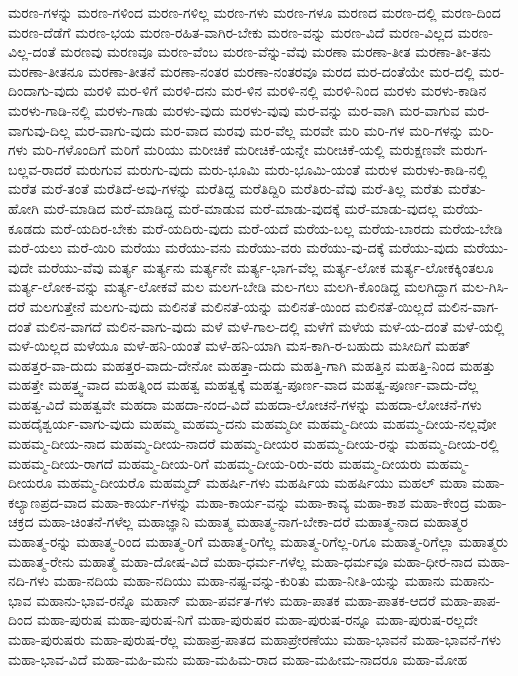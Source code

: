 {ಮರಣ-ಗಳನ್ನು
ಮರಣ-ಗಳಿಂದ
ಮರಣ-ಗಳಿಲ್ಲ
ಮರಣ-ಗಳು
ಮರಣ-ಗಳೂ
ಮರಣದ
ಮರಣ-ದಲ್ಲಿ
ಮರಣ-ದಿಂದ
ಮರಣ-ದೆಡೆಗೆ
ಮರಣ-ಭಯ
ಮರಣ-ರಹಿತ-ವಾಗಿರ-ಬೇಕು
ಮರಣ-ವನ್ನು
ಮರಣ-ವಿದೆ
ಮರಣ-ವಿಲ್ಲದ
ಮರಣ-ವಿಲ್ಲ-ದಂತೆ
ಮರಣವು
ಮರಣವೂ
ಮರಣ-ವೆಂಬ
ಮರಣ-ವೆನ್ನು-ವೆವು
ಮರಣಾ
ಮರಣಾ-ತೀತ
ಮರಣಾ-ತೀ-ತನು
ಮರಣಾ-ತೀತನೂ
ಮರಣಾ-ತೀತನೆ
ಮರಣಾ-ನಂತರ
ಮರಣಾ-ನಂತರವೂ
ಮರದ
ಮರ-ದಂತೆಯೇ
ಮರ-ದಲ್ಲಿ
ಮರ-ದಿಂದಾಗು-ವುದು
ಮರಳಿ
ಮರ-ಳಿಗೆ
ಮರಳಿ-ದನು
ಮರ-ಳಿನ
ಮರಳಿ-ನಲ್ಲಿ
ಮರಳಿ-ನಿಂದ
ಮರಳು
ಮರಳು-ಕಾಡಿನ
ಮರಳು-ಗಾಡಿ-ನಲ್ಲಿ
ಮರಳು-ಗಾಡು
ಮರಳು-ವುದು
ಮರಳು-ವುವು
ಮರ-ವನ್ನು
ಮರ-ವಾಗಿ
ಮರ-ವಾಗುವ
ಮರ-ವಾಗುವು-ದಿಲ್ಲ
ಮರ-ವಾಗು-ವುದು
ಮರ-ವಾದ
ಮರವು
ಮರ-ವೆಲ್ಲ
ಮರವೇ
ಮರಿ
ಮರಿ-ಗಳ
ಮರಿ-ಗಳನ್ನು
ಮರಿ-ಗಳು
ಮರಿ-ಗಳೊಂದಿಗೆ
ಮರಿಗೆ
ಮರಿಯು
ಮರೀಚಿಕೆ
ಮರೀಚಿಕೆ-ಯನ್ನೇ
ಮರೀಚಿಕೆ-ಯಲ್ಲಿ
ಮರುಕ್ಷಣವೇ
ಮರುಗ-ಬಲ್ಲವ-ರಾದರೆ
ಮರುಗುವ
ಮರುಗು-ವುದು
ಮರು-ಭೂಮಿ
ಮರು-ಭೂಮಿ-ಯಂತೆ
ಮರುಳ
ಮರುಳು-ಕಾಡಿ-ನಲ್ಲಿ
ಮರೆತ
ಮರೆ-ತಂತೆ
ಮರೆತಿದೆ-ಅವು-ಗಳನ್ನು
ಮರೆತಿದ್ದ
ಮರೆತಿದ್ದಿರಿ
ಮರೆತಿರು-ವೆವು
ಮರೆ-ತಿಲ್ಲ
ಮರೆತು
ಮರೆತು-ಹೋಗಿ
ಮರೆ-ಮಾಡಿದ
ಮರೆ-ಮಾಡಿದ್ದ
ಮರೆ-ಮಾಡುವ
ಮರೆ-ಮಾಡು-ವುದಕ್ಕೆ
ಮರೆ-ಮಾಡು-ವುದಲ್ಲ
ಮರೆಯ-ಕೂಡದು
ಮರೆ-ಯದಿರ-ಬೇಕು
ಮರೆ-ಯದಿರು-ವುದು
ಮರೆ-ಯದೆ
ಮರೆಯ-ಬಲ್ಲ
ಮರೆಯ-ಬಾರದು
ಮರೆಯ-ಬೇಡಿ
ಮರೆ-ಯಲು
ಮರೆ-ಯಿರಿ
ಮರೆಯು
ಮರೆಯು-ವನು
ಮರೆಯು-ವರು
ಮರೆಯು-ವು-ದಕ್ಕೆ
ಮರೆಯು-ವುದು
ಮರೆಯು-ವುದೇ
ಮರೆಯು-ವೆವು
ಮರ್ತ್ಯ
ಮರ್ತ್ಯನು
ಮರ್ತ್ಯನೇ
ಮರ್ತ್ಯ-ಭಾಗ-ವೆಲ್ಲ
ಮರ್ತ್ಯ-ಲೋಕ
ಮರ್ತ್ಯ-ಲೋಕಕ್ಕಿಂತಲೂ
ಮರ್ತ್ಯ-ಲೋಕ-ವನ್ನು
ಮರ್ತ್ಯ-ಲೋಕವೆ
ಮಲ
ಮಲಗ-ಬೇಡಿ
ಮಲ-ಗಲು
ಮಲಗಿ-ಕೊಂಡಿದ್ದ
ಮಲಗಿದ್ದಾಗ
ಮಲ-ಗಿಸಿ-ದರೆ
ಮಲಗುತ್ತೇನೆ
ಮಲಗು-ವುದು
ಮಲಿನತೆ
ಮಲಿನತೆ-ಯನ್ನು
ಮಲಿನತೆ-ಯಿಂದ
ಮಲಿನತೆ-ಯಿಲ್ಲದೆ
ಮಲಿನ-ವಾಗ-ದಂತೆ
ಮಲಿನ-ವಾಗದೆ
ಮಲಿನ-ವಾಗು-ವುದು
ಮಳೆ
ಮಳೆ-ಗಾಲ-ದಲ್ಲಿ
ಮಳೆಗೆ
ಮಳೆಯ
ಮಳೆ-ಯ-ದಂತೆ
ಮಳೆ-ಯಲ್ಲಿ
ಮಳೆ-ಯಿಲ್ಲದ
ಮಳೆಯೂ
ಮಳೆ-ಹನಿ-ಯಂತೆ
ಮಳೆ-ಹನಿ-ಯಾಗಿ
ಮಸ-ಕಾಗಿ-ರ-ಬಹುದು
ಮಸೀದಿಗೆ
ಮಹತ್
ಮಹತ್ತರ-ವಾ-ದುದು
ಮಹತ್ತರ-ವಾದು-ದೇನೋ
ಮಹತ್ತಾ-ದುದು
ಮಹತ್ತಿ-ಗಾಗಿ
ಮಹತ್ತಿನ
ಮಹತ್ತಿ-ನಿಂದ
ಮಹತ್ತು
ಮಹತ್ತೇ
ಮಹತ್ತ್ವ-ವಾದ
ಮಹತ್ನಿಂದ
ಮಹತ್ವ
ಮಹತ್ವಕ್ಕೆ
ಮಹತ್ವ-ಪೂರ್ಣ-ವಾದ
ಮಹತ್ವ-ಪೂರ್ಣ-ವಾದು-ದೆಲ್ಲ
ಮಹತ್ವ-ವಿದೆ
ಮಹತ್ವವೇ
ಮಹದಾ
ಮಹದಾ-ನಂದ-ವಿದೆ
ಮಹದಾ-ಲೋಚನೆ-ಗಳನ್ನು
ಮಹದಾ-ಲೋಚನೆ-ಗಳು
ಮಹದೈಶ್ವರ್ಯ-ವಾಗು-ವುದು
ಮಹಮ್ಮ
ಮಹಮ್ಮ-ದನು
ಮಹಮ್ಮದೀ
ಮಹಮ್ಮ-ದೀಯ
ಮಹಮ್ಮ-ದೀಯ-ನಲ್ಲವೋ
ಮಹಮ್ಮ-ದೀಯ-ನಾದ
ಮಹಮ್ಮ-ದೀಯ-ನಾದರೆ
ಮಹಮ್ಮ-ದೀಯರ
ಮಹಮ್ಮ-ದೀಯ-ರನ್ನು
ಮಹಮ್ಮ-ದೀಯ-ರಲ್ಲಿ
ಮಹಮ್ಮ-ದೀಯ-ರಾಗದೆ
ಮಹಮ್ಮ-ದೀಯ-ರಿಗೆ
ಮಹಮ್ಮ-ದೀಯ-ರಿರು-ವರು
ಮಹಮ್ಮ-ದೀಯರು
ಮಹಮ್ಮ-ದೀಯರೂ
ಮಹಮ್ಮ-ದೀಯರೊ
ಮಹಮ್ಮದ್
ಮಹರ್ಷಿ-ಗಳು
ಮಹರ್ಷಿಯ
ಮಹರ್ಷಿಯು
ಮಹಲ್
ಮಹಾ
ಮಹಾ-ಕಲ್ಯಾಣಪ್ರದ-ವಾದ
ಮಹಾ-ಕಾರ್ಯ-ಗಳನ್ನು
ಮಹಾ-ಕಾರ್ಯ-ವನ್ನು
ಮಹಾ-ಕಾವ್ಯ
ಮಹಾ-ಕಾಶ
ಮಹಾ-ಕೇಂದ್ರ
ಮಹಾ-ಚಕ್ರದ
ಮಹಾ-ಚಿಂತನೆ-ಗಳೆಲ್ಲ
ಮಹಾಜ್ಞಾನಿ
ಮಹಾತ್ಮ
ಮಹಾತ್ಮ-ನಾಗ-ಬೇಕಾ-ದರೆ
ಮಹಾತ್ಮ-ನಾದ
ಮಹಾತ್ಮರ
ಮಹಾತ್ಮ-ರನ್ನು
ಮಹಾತ್ಮ-ರಿಂದ
ಮಹಾತ್ಮ-ರಿಗೆ
ಮಹಾತ್ಮ-ರಿಗೆಲ್ಲ
ಮಹಾತ್ಮ-ರಿಗೆಲ್ಲ-ರಿಗೂ
ಮಹಾತ್ಮ-ರಿಗೆಲ್ಲಾ
ಮಹಾತ್ಮರು
ಮಹಾತ್ಮ-ರೇನು
ಮಹಾತ್ಮೆ
ಮಹಾ-ದೋಷ-ವಿದೆ
ಮಹಾ-ಧರ್ಮ-ಗಳೆಲ್ಲ
ಮಹಾ-ಧರ್ಮವೂ
ಮಹಾ-ಧೀರ-ನಾದ
ಮಹಾ-ನದಿ-ಗಳು
ಮಹಾ-ನದಿಯ
ಮಹಾ-ನದಿಯು
ಮಹಾ-ನಷ್ಟ-ವನ್ನು-ಕುರಿತು
ಮಹಾ-ನೀತಿ-ಯನ್ನು
ಮಹಾನು
ಮಹಾನು-ಭಾವ
ಮಹಾನು-ಭಾವ-ರನ್ನೊ
ಮಹಾನ್
ಮಹಾ-ಪರ್ವತ-ಗಳು
ಮಹಾ-ಪಾತಕ
ಮಹಾ-ಪಾತಕ-ಆದರೆ
ಮಹಾ-ಪಾಪ-ದಿಂದ
ಮಹಾ-ಪುರುಷ
ಮಹಾ-ಪುರುಷ-ನಿಗೆ
ಮಹಾ-ಪುರುಷರ
ಮಹಾ-ಪುರುಷ-ರನ್ನೂ
ಮಹಾ-ಪುರುಷ-ರಲ್ಲದೇ
ಮಹಾ-ಪುರುಷರು
ಮಹಾ-ಪುರುಷ-ರೆಲ್ಲ
ಮಹಾಪ್ರ-ಪಾತದ
ಮಹಾಪ್ರೇರಣೆಯು
ಮಹಾ-ಭಾವನೆ
ಮಹಾ-ಭಾವನೆ-ಗಳು
ಮಹಾ-ಭಾವ-ವಿದೆ
ಮಹಾ-ಮಹಿ-ಮನು
ಮಹಾ-ಮಹಿಮ-ರಾದ
ಮಹಾ-ಮಹೀಮ-ನಾದರೂ
ಮಹಾ-ಮೋಹ
}
